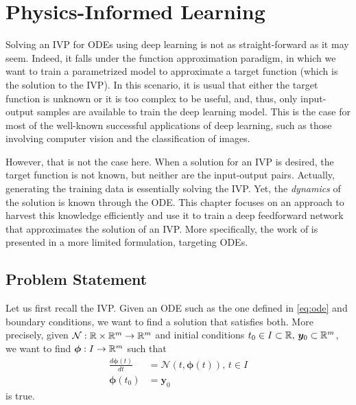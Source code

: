 \chapter{Physics-Informed Learning}\label{ch:pinn}

Solving an \gls{IVP} for \gls{ODE}s using deep learning is not as straight-forward as it may seem.
Indeed, it falls under the function approximation paradigm, in which we want to train a parametrized model to approximate a target function (which is the solution to the \gls{IVP}).
In this scenario, it is usual that either the target function is unknown or it is too complex to be useful, and, thus, only input-output samples are available to train the deep learning model.
This is the case for most of the well-known successful applications of deep learning, such as those involving computer vision and the classification of images. %

However, that is not the case here.
When a solution for an \gls{IVP} is desired, the target function is not known, but neither are the input-output pairs.
Actually, generating the training data is essentially solving the \gls{IVP}.
Yet, the \emph{dynamics} of the solution is known through the \gls{ODE}.
This chapter focuses on an approach to harvest this knowledge efficiently and use it to train a deep feedforward network that approximates the solution of an \gls{IVP}.
More specifically, the work of \textcite{Raissi2019} is presented in a more limited formulation, targeting \gls{ODE}s\footnotemark.

\section{Problem Statement}\label{sec:pinn-problem}

Let us first recall the \gls{IVP}.
Given an \gls{ODE} such as the one defined in \eqref{eq:ode} and boundary conditions, we want to find a solution that satisfies both.
More precisely, given $\mathcal{N}:\mathbb{R}\times \mathbb{R}^m\to \mathbb{R}^{m}$ and initial conditions $t_0\in I\subset \mathbb{R},\,\bm{y}_0\subset \mathbb{R}^{m}$, we want to find $\bm{\phi}:I\to \mathbb{R}^{m}$ such that
\begin{align*}
    \frac{d \bm{\phi}(t)}{d t} &= \mathcal{N}\left( t, \bm{\phi}(t) \right),\,t\in I \\
    \bm{\phi}(t_0) &= \bm{y}_0
\end{align*}
is true.

